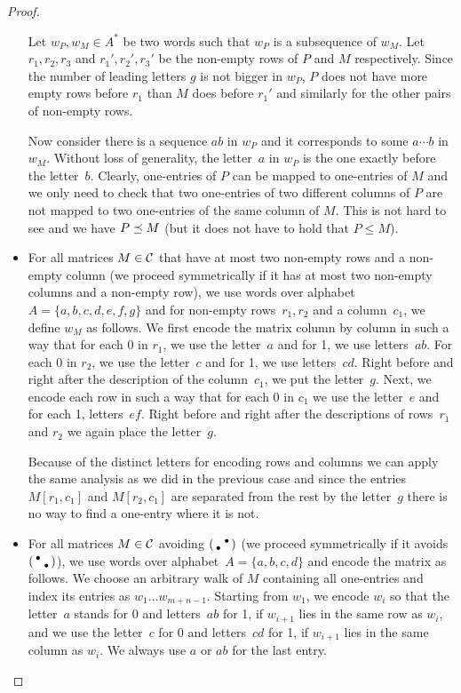 \begin{proof}
\begin{itemize}
		Let $w_P,w_M\in A^*$ be two words such that $w_P$ is a subsequence of $w_M$. Let $r_1,r_2,r_3$ and $r_1',r_2',r_3'$ be the non-empty rows of $P$ and $M$ respectively. Since the number of leading letters $g$ is not bigger in $w_P$, $P$ does not have more empty rows before $r_1$ than $M$ does before $r_1'$ and similarly for the other pairs of non-empty rows.

		Now consider there is a sequence $ab$ in $w_P$ and it corresponds to some $a\cdots b$ in $w_M$. Without loss of generality, the letter~$a$ in $w_P$ is the one exactly before the letter~$b$. Clearly, one-entries of $P$ can be mapped to one-entries of $M$ and we only need to check that two one-entries of two different columns of $P$ are not mapped to two one-entries of the same column of $M$. This is not hard to see and we have $P\preceq M$ (but it does not have to hold that $P\leq M$).
	\item For all matrices $M\in\mathcal{C}$ that have at most two non-empty rows and a non-empty column (we proceed symmetrically if it has at most two non-empty columns and a non-empty row), we use words over alphabet~$A=\{a,b,c,d,e,f,g\}$ and for non-empty rows~$r_1,r_2$ and a column~$c_1$, we define $w_M$ as follows. We first encode the matrix column by column in such a way that for each 0 in $r_1$, we use the letter~$a$ and for 1, we use letters~$ab$. For each 0 in $r_2$, we use the letter~$c$ and for 1, we use letters~$cd$. Right before and right after the description of the column~$c_1$, we put the letter~$g$. Next, we encode each row in such a way that for each 0 in $c_1$ we use the letter~$e$ and for each 1, letters~$ef$. Right before and right after the descriptions of rows~$r_1$ and $r_2$ we again place the letter~$g$.
		
		Because of the distinct letters for encoding rows and columns we can apply the same analysis as we did in the previous case and since the entries $M[r_1,c_1]$ and $M[r_2,c_1]$ are separated from the rest by the letter~$g$ there is no way to find a one-entry where it is not.
	\item For all matrices $M\in\mathcal{C}$ avoiding $\left(\begin{smallmatrix} &\bullet\\\bullet& \end{smallmatrix}\right)$ (we proceed symmetrically if it avoids $\left(\begin{smallmatrix}\bullet& \\ &\bullet\end{smallmatrix}\right)$), we use words over alphabet~$A=\{a,b,c,d\}$ and encode the matrix as follows. We choose an arbitrary walk of $M$ containing all one-entries and index its entries as $w_1\dots w_{m+n-1}$. Starting from $w_1$, we encode $w_i$ so that the letter~$a$ stands for 0 and letters~$ab$ for 1, if $w_{i+1}$ lies in the same row as $w_i$, and we use the letter~$c$ for 0 and letters~$cd$ for 1, if $w_{i+1}$ lies in the same column as $w_i$. We always use $a$ or $ab$ for the last entry.
	

\end{itemize}
\end{proof}
